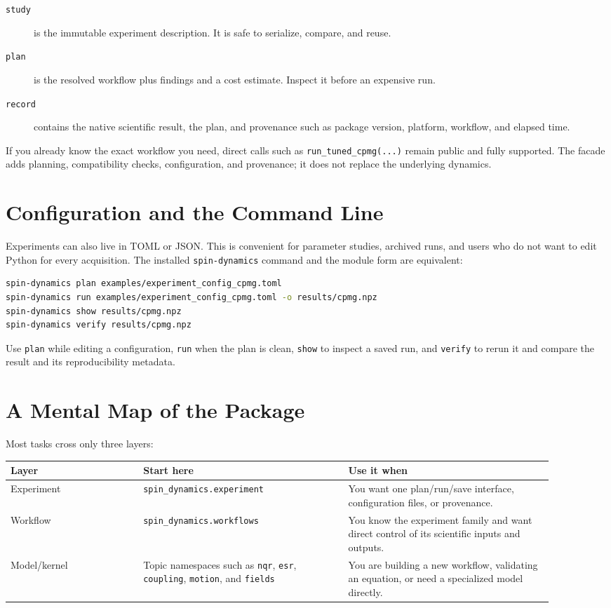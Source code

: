 \documentclass[11pt,oneside]{report}
\newcommand{\code}[1]{\texttt{#1}}
\begin{document}
\begin{description}
  \item[\code{study}] is the immutable experiment description. It is safe to
  serialize, compare, and reuse.
  \item[\code{plan}] is the resolved workflow plus findings and a cost estimate.
  Inspect it before an expensive run.
  \item[\code{record}] contains the native scientific result, the plan, and
  provenance such as package version, platform, workflow, and elapsed time.
\end{description}

If you already know the exact workflow you need, direct calls such as
\code{run\_tuned\_cpmg(...)} remain public and fully supported. The facade adds
planning, compatibility checks, configuration, and provenance; it does not
replace the underlying dynamics.

\section{Configuration and the Command Line}

Experiments can also live in TOML or JSON. This is convenient for parameter
studies, archived runs, and users who do not want to edit Python for every
acquisition. The installed \code{spin-dynamics} command and the module form are
equivalent:

\begin{lstlisting}[language=bash]
spin-dynamics plan examples/experiment_config_cpmg.toml
spin-dynamics run examples/experiment_config_cpmg.toml -o results/cpmg.npz
spin-dynamics show results/cpmg.npz
spin-dynamics verify results/cpmg.npz
\end{lstlisting}

Use \code{plan} while editing a configuration, \code{run} when the plan is
clean, \code{show} to inspect a saved run, and \code{verify} to rerun it and
compare the result and its reproducibility metadata.

\section{A Mental Map of the Package}

Most tasks cross only three layers:

\begin{longtable}{p{0.22\linewidth}p{0.34\linewidth}p{0.34\linewidth}}
\toprule
Layer & Start here & Use it when \tabularnewline
\midrule
Experiment & \code{spin\_dynamics.experiment} & You want one plan/run/save
interface, configuration files, or provenance. \tabularnewline
Workflow & \code{spin\_dynamics.workflows} & You know the experiment family and
want direct control of its scientific inputs and outputs. \tabularnewline
Model/kernel & Topic namespaces such as \code{nqr}, \code{esr},
\code{coupling}, \code{motion}, and \code{fields} & You are building a new
workflow, validating an equation, or need a specialized model directly.
\tabularnewline
\bottomrule
\end{longtable}
\end{document}
